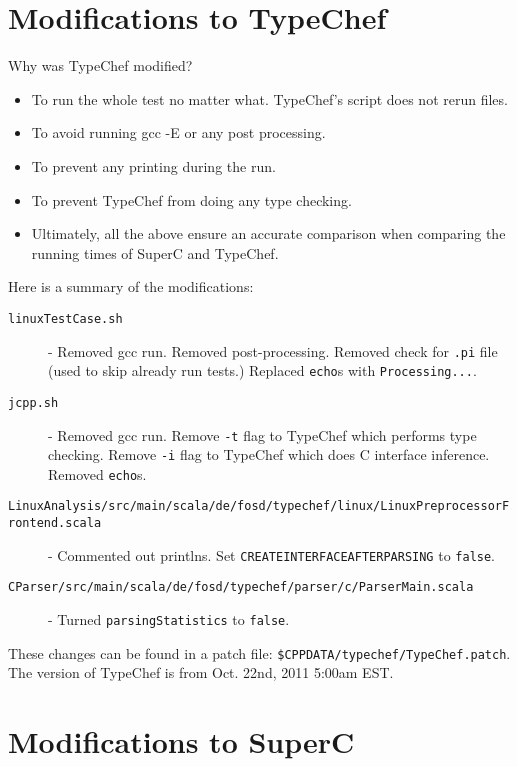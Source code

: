 \documentclass{report}
\begin{document}

\section{Modifications to TypeChef}

Why was TypeChef modified?
\begin{itemize}
\item To run the whole test no matter what.  TypeChef's script does
  not rerun files.
\item To avoid running gcc -E or any post processing.
\item To prevent any printing during the run.
\item To prevent TypeChef from doing any type checking.
\item Ultimately, all the above ensure an accurate comparison when
  comparing the running times of SuperC and TypeChef.
\end{itemize}

Here is a summary of the modifications:

\begin{description}
\item[\texttt{linuxTestCase.sh}] - Removed gcc run.  Removed post-processing.
  Removed check for \verb".pi" file (used to skip already run tests.)
  Replaced \verb"echo"s with \verb"Processing...".
\item[\texttt{jcpp.sh}] - Removed gcc run.  Remove \verb"-t" flag to TypeChef
  which performs type checking.  Remove \verb"-i" flag to TypeChef which
  does C interface inference.  Removed \verb"echo"s.
\item[\texttt{LinuxAnalysis/src/main/scala/de/fosd/typechef/linux/LinuxPreprocessorFrontend.scala}]
  - Commented out printlns.  Set \verb"CREATEINTERFACEAFTERPARSING" to
  \verb"false".
\item[\texttt{CParser/src/main/scala/de/fosd/typechef/parser/c/ParserMain.scala}]
  - Turned \verb"parsingStatistics" to \verb"false".
\end{description}

These changes can be found in a patch file:
\verb"$CPPDATA/typechef/TypeChef.patch".  The version of TypeChef is from
Oct. 22nd, 2011 5:00am EST.



\section{Modifications to SuperC}
\end{document}
